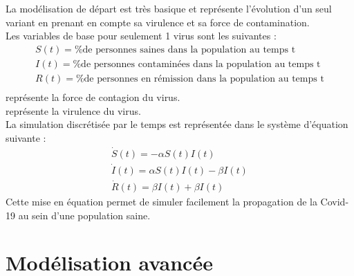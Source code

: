 \documentclass{article}
\begin{document}
La modélisation de départ est très basique et représente l'évolution d'un seul variant en prenant en compte sa virulence et sa force de contamination.\\
\noindent
Les variables de base pour seulement 1 virus sont les suivantes : 
\begin{align}
    S(t)= \text{\% de personnes saines dans la population au temps t} \\
    I(t)= \text{\% de personnes contaminées dans la population au temps t} \\
    R(t)= \text{\% de personnes en rémission dans la population au temps t} \\
\end{align}
\noindent
\textalpha \space représente la force de contagion du virus. \\
\textbeta \space représente la virulence du virus. \\
\noindent
La simulation discrétisée par le temps est représentée dans le système d'équation suivante : 
\begin{align}
    \dot{S}(t)= -\alpha S(t)I(t) \\
    \dot{I}(t)= \alpha S(t)I(t)-\beta I(t) \\
    \dot{R}(t)= \beta I(t) + \beta I(t)
\end{align}
\noindent
Cette mise en équation permet de simuler facilement la propagation de la Covid-19 au sein d'une population saine.\\

\section{Modélisation avancée}
\end{document}
